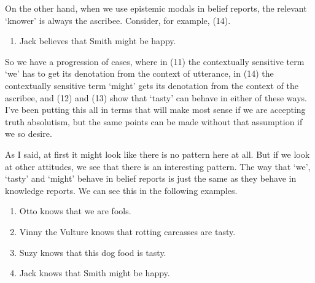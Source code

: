 
{On the other hand, when we use epistemic modals in belief reports, the relevant `knower' is always the ascribee. Consider, for example, (14).}

\begin{enumerate}
\renewcommand{\labelenumi}{(\arabic{enumi})}
\setcounter{enumi}{13}
\item {Jack believes that Smith might be happy.}
\end{enumerate}


{So we have a progression of cases, where in (11) the contextually sensitive term `we' has to get its denotation from the context of utterance, in (14) the contextually sensitive term `might' gets its denotation from the context of the ascribee, and (12) and (13) show that `tasty' can behave in either of these ways. I've been putting this all in terms that will make most sense if we are accepting truth absolutism, but the same points can be made without that assumption if we so desire.}

{As I said, at first it might look like there is no pattern here at all. But if we look at other attitudes, we see that there is an interesting pattern. The way that `we', `tasty' and `might' behave in belief reports is just the same as they behave in knowledge reports. We can see this in the following examples.}

\begin{enumerate}
\renewcommand{\labelenumi}{(\arabic{enumi}a)}
\setcounter{enumi}{10}
\item {Otto knows that we are fools.}
\item {Vinny the Vulture knows that rotting carcasses are tasty.}
\item {Suzy knows that this dog food is tasty.}
\item {Jack knows that Smith might be happy.}
\end{enumerate}


